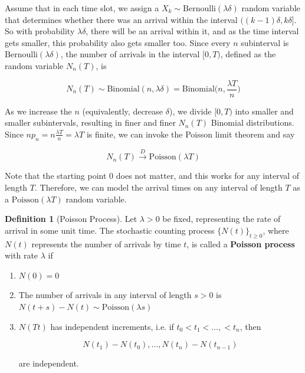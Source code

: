 \documentclass{article}
\theoremstyle{definition}
\theoremstyle{remark}
\theoremstyle{definition}
\newtheorem{definition}{Definition}[section]
\begin{document}
    \begin{center}
    \end{center}

    Assume that in each time slot, we assign a $X_k \sim \mathrm{Bernoulli}(\lambda \delta)$ random variable that determines whether there was an arrival within the interval $((k-1)\delta, k\delta]$. So with probability $\lambda\delta$, there will be an arrival within it, and as the time interval gets smaller, this probability also gets smaller too. Since every $n$ subinterval is $\mathrm{Bernoulli}(\lambda \delta)$, the number of arrivals in the interval $[0, T)$, defined as the random variable $N_n (T)$, is 

      \[N_n (T) \sim \mathrm{Binomial}(n, \lambda \delta) = \mathrm{Binomial}\big(n, \frac{\lambda T}{n}\big)\]

    As we increase the $n$ (equivalently, decrease $\delta$), we divide $[0, T)$ into smaller and smaller subintervals, resulting in finer and finer $N_n(T)$ Binomial distributions. Since $n p_n = n \frac{\lambda T}{n} = \lambda T$ is finite, we can invoke the Poisson limit theorem and say 

      \[N_n (T) \xrightarrow{D} \mathrm{Poisson}(\lambda T)\]

    Note that the starting point $0$ does not matter, and this works for any interval of length $T$. Therefore, we can model the arrival times on any interval of length $T$ as a $\mathrm{Poisson}(\lambda T)$ random variable. 

    \begin{definition}[Poisson Process]
      Let $\lambda > 0$ be fixed, representing the rate of arrival in some unit time. The stochastic counting process $\{N(t)\}_{t \geq 0}$, where $N(t)$ represents the number of arrivals by time $t$, is called a \textbf{Poisson process} with rate $\lambda$ if 
      \begin{enumerate}
        \item $N(0) = 0$ 

        \item The number of arrivals in any interval of length $s > 0$ is $N(t + s) - N(t) \sim \mathrm{Poisson}(\lambda s)$ 

        \item $N(Tt)$ has independent increments, i.e. if $t_0 < t_1 < \ldots, < t_n$, then 

          \[N(t_1) - N(t_0), \ldots, N(t_n) - N(t_{n-1})\]

        are independent. 
      \end{enumerate}
    \end{definition}
\end{document}
